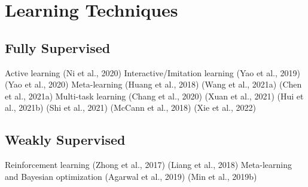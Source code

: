 \section{Learning Techniques}

\subsection{Fully Supervised}

Active learning (Ni et al., 2020)
Interactive/Imitation learning (Yao et al., 2019) (Yao et al., 2020)
Meta-learning (Huang et al., 2018) (Wang et al., 2021a) (Chen et al., 2021a)
Multi-task learning (Chang et al., 2020) (Xuan et al., 2021) (Hui et al., 2021b) (Shi et al., 2021) (McCann et al., 2018) (Xie et al., 2022)

\subsection{Weakly Supervised}

Reinforcement learning (Zhong et al., 2017) (Liang et al., 2018)
Meta-learning and Bayesian optimization (Agarwal et al., 2019)
(Min et al., 2019b)